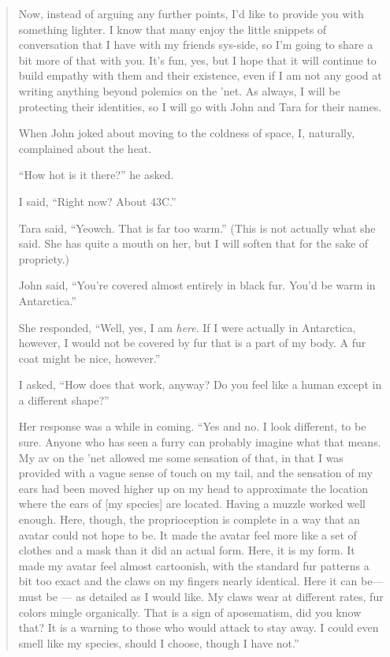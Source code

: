 \begin{quote}
Now, instead of arguing any further points, I'd like to provide you with something lighter. I know that many enjoy the little snippets of conversation that I have with my friends sys-side, so I'm going to share a bit more of that with you. It's fun, yes, but I hope that it will continue to build empathy with them and their existence, even if I am not any good at writing anything beyond polemics on the 'net. As always, I will be protecting their identities, so I will go with John and Tara for their names.

When John joked about moving to the coldness of space, I, naturally, complained about the heat.

``How hot is it there?'' he asked.

I said, ``Right now? About 43C.''

Tara said, ``Yeowch. That is far too warm.'' (This is not actually what she said. She has quite a mouth on her, but I will soften that for the sake of propriety.)

John said, ``You're covered almost entirely in black fur. You'd be warm in Antarctica.''

She responded, ``Well, yes, I am \emph{here}. If I were actually in Antarctica, however, I would not be covered by fur that is a part of my body. A fur coat might be nice, however.''

I asked, ``How does that work, anyway? Do you feel like a human except in a different shape?''

Her response was a while in coming. ``Yes and no. I look different, to be sure. Anyone who has seen a furry can probably imagine what that means. My av on the 'net allowed me some sensation of that, in that I was provided with a vague sense of touch on my tail, and the sensation of my ears had been moved higher up on my head to approximate the location where the ears of {[}my species{]} are located. Having a muzzle worked well enough. Here, though, the proprioception is complete in a way that an avatar could not hope to be. It made the avatar feel more like a set of clothes and a mask than it did an actual form. Here, it is my form. It made my avatar feel almost cartoonish, with the standard fur patterns a bit too exact and the claws on my fingers nearly identical. Here it can be---must be — as detailed as I would like. My claws wear at different rates, fur colors mingle organically. That is a sign of aposematism, did you know that? It is a warning to those who would attack to stay away. I could even smell like my species, should I choose, though I have not.''


\end{quote}
